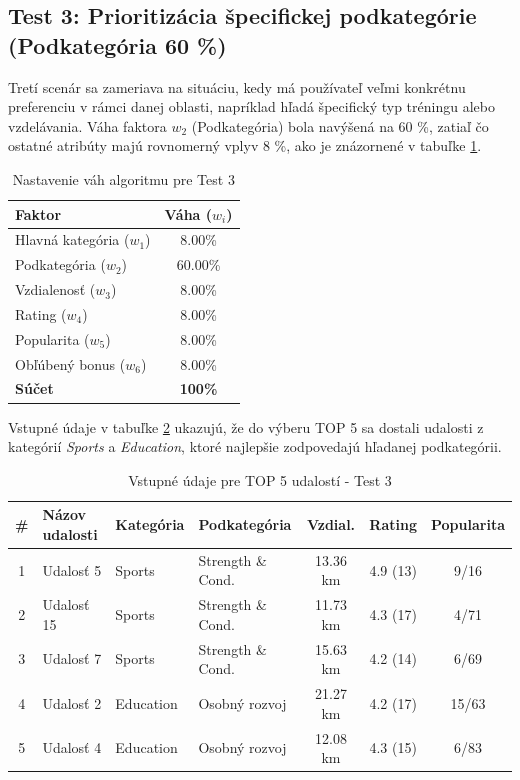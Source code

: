 \subsection{Test 3: Prioritizácia špecifickej podkategórie (Podkategória 60 \%)}

Tretí scenár sa zameriava na situáciu, kedy má používateľ veľmi konkrétnu preferenciu v rámci danej oblasti, napríklad hľadá špecifický typ tréningu alebo vzdelávania. Váha faktora $w_2$ (Podkategória) bola navýšená na 60 \%, zatiaľ čo ostatné atribúty majú rovnomerný vplyv 8 \%, ako je znázornené v tabuľke \ref{tab:vahy_test3}.

\begin{table}[H]
\centering
\begin{tabular}{|l|c|}
\hline
\textbf{Faktor} & \textbf{Váha ($w_i$)} \\
\hline
Hlavná kategória ($w_1$) & 8.00\% \\
Podkategória ($w_2$) & 60.00\% \\
Vzdialenosť ($w_3$) & 8.00\% \\
Rating ($w_4$) & 8.00\% \\
Popularita ($w_5$) & 8.00\% \\
Obľúbený bonus ($w_6$) & 8.00\% \\
\hline
\textbf{Súčet} & \textbf{100\%} \\
\hline
\end{tabular}
\caption{Nastavenie váh algoritmu pre Test 3}
\label{tab:vahy_test3}
\end{table}

Vstupné údaje v tabuľke \ref{tab:data_test3} ukazujú, že do výberu TOP 5 sa dostali udalosti z kategórií \textit{Sports} a \textit{Education}, ktoré najlepšie zodpovedajú hľadanej podkategórii.

\begin{table}[H]
\centering
\small
\begin{tabular}{|c|l|l|l|c|c|c|}
\hline
\textbf{\#} & \textbf{Názov udalosti} & \textbf{Kategória} & \textbf{Podkategória} & \textbf{Vzdial.} & \textbf{Rating} & \textbf{Popularita} \\
\hline
1 & Udalosť 5  & Sports    & Strength \& Cond. & 13.36 km & 4.9 (13) & 9/16 \\
2 & Udalosť 15 & Sports    & Strength \& Cond. & 11.73 km & 4.3 (17) & 4/71 \\
3 & Udalosť 7  & Sports    & Strength \& Cond. & 15.63 km & 4.2 (14) & 6/69 \\
4 & Udalosť 2  & Education & Osobný rozvoj     & 21.27 km & 4.2 (17) & 15/63 \\
5 & Udalosť 4  & Education & Osobný rozvoj     & 12.08 km & 4.3 (15) & 6/83 \\
\hline
\end{tabular}
\caption{Vstupné údaje pre TOP 5 udalostí - Test 3}
\label{tab:data_test3}
\end{table}



